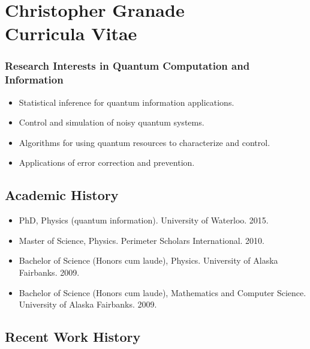 \documentclass[]{article}
\date{}
\begin{document}
\section{\texorpdfstring{Christopher Granade\\Curricula
Vitae}{Christopher Granade Curricula Vitae}}\label{christopher-granade-curricula-vitae}

\subsubsection{Research Interests in Quantum Computation and
Information}\label{research-interests-in-quantum-computation-and-information}

\begin{itemize}
\itemsep1pt\parskip0pt
\item
  Statistical inference for quantum information applications.
\item
  Control and simulation of noisy quantum systems.
\item
  Algorithms for using quantum resources to characterize and control.
\item
  Applications of error correction and prevention.
\end{itemize}

\subsection{Academic History}\label{academic-history}

\begin{itemize}
\itemsep1pt\parskip0pt
\item
  PhD, Physics (quantum information). University of Waterloo. 2015.
\item
  Master of Science, Physics. Perimeter Scholars International. 2010.
\item
  Bachelor of Science (Honors cum laude), Physics. University of Alaska
  Fairbanks. 2009.
\item
  Bachelor of Science (Honors cum laude), Mathematics and Computer
  Science. University of Alaska Fairbanks. 2009.
\end{itemize}

\subsection{Recent Work History}\label{recent-work-history}
\end{document}
